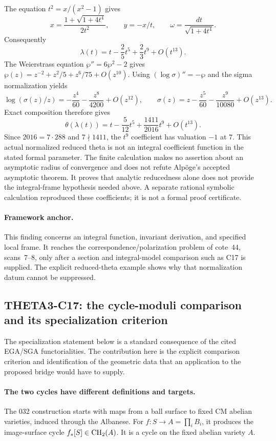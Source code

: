\documentclass[11pt]{article}
\theoremstyle{definition}\newtheorem{definition}[theorem]{Definition}\newtheorem{remark}[theorem]{Remark}
\begin{document}
The equation $t^2=x/(x^2-1)$ gives
\[
 x=\frac{1+\sqrt{1+4t^4}}{2t^2},\qquad y=-x/t,
 \qquad \omega=\frac{dt}{\sqrt{1+4t^4}}.
\]
Consequently
\[
 \lambda(t)=t-\frac25t^5+\frac23t^9+O(t^{13}).
\]
The Weierstrass equation $\wp''=6\wp^2-2$ gives
$\wp(z)=z^{-2}+z^2/5+z^6/75+O(z^{10})$.
Using $(\log\sigma)''=-\wp$ and the sigma normalization yields
\[
 \log(\sigma(z)/z)=-\frac{z^4}{60}-\frac{z^8}{4200}+O(z^{12}),
 \qquad
 \sigma(z)=z-\frac{z^5}{60}-\frac{z^9}{10080}+O(z^{13}).
\]
Exact composition therefore gives
\[
 \theta(\lambda(t))
 =t-\frac5{12}t^5+\frac{1411}{2016}t^9+O(t^{13}).
\]
Since $2016=7\cdot288$ and $7\nmid1411$, the $t^9$ coefficient
has valuation $-1$ at $7$. This actual normalized reduced theta is
not an integral coefficient function in the stated formal
parameter. The finite calculation makes no assertion about an
asymptotic radius of convergence and does not refute Alp\"oge's
accepted asymptotic theorem. It proves that analytic reducedness
alone does not provide the integral-frame hypothesis needed above.
A separate rational symbolic calculation reproduced these
coefficients; it is not a formal proof certificate.

\paragraph{Framework anchor.}
This finding concerns an integral function, invariant derivation, and
specified local frame.  It reaches the correspondence/polarization
problem of cote~44, scans~7--8, only after a section and integral-model
comparison such as C17 is supplied.  The explicit reduced-theta example
shows why that normalization datum cannot be suppressed.

\subsection{THETA3-C17: the cycle-moduli comparison and its specialization criterion}
\label{C17}

The specialization statement below is a standard consequence of the cited
EGA/SGA functorialities.  The contribution here is the explicit comparison
criterion and identification of the geometric data that an application
to the proposed bridge would have to supply.

\paragraph{The two cycles have different definitions and targets.}
The 032 construction starts with maps from a ball surface to fixed
CM abelian varieties, induced through the Albanese. For
$f:S\to A=\prod_iB_i$, it produces the image-surface cycle
$f_*[S]\in\operatorname{CH}_2(A)$. It is a cycle on the fixed abelian variety
$A$.
\end{document}
